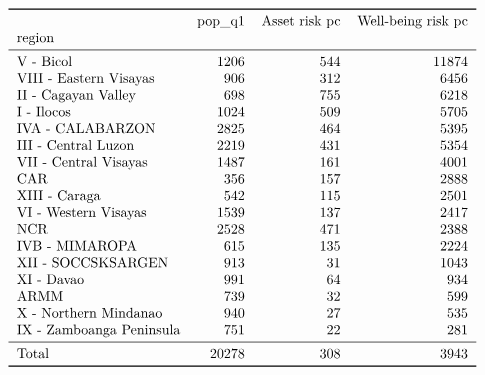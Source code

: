 \documentclass[10pt]{article}
\begin{document}
\[\begin{tabular}{lrrr}
\toprule
{} &  pop\_q1 &  Asset risk pc &  Well-being risk pc \\
region                   &         &                &                     \\
\midrule
V - Bicol                &    1206 &            544 &               11874 \\
VIII - Eastern Visayas   &     906 &            312 &                6456 \\
II - Cagayan Valley      &     698 &            755 &                6218 \\
I - Ilocos               &    1024 &            509 &                5705 \\
IVA - CALABARZON         &    2825 &            464 &                5395 \\
III - Central Luzon      &    2219 &            431 &                5354 \\
VII - Central Visayas    &    1487 &            161 &                4001 \\
CAR                      &     356 &            157 &                2888 \\
XIII - Caraga            &     542 &            115 &                2501 \\
VI - Western Visayas     &    1539 &            137 &                2417 \\
NCR                      &    2528 &            471 &                2388 \\
IVB - MIMAROPA           &     615 &            135 &                2224 \\
XII - SOCCSKSARGEN       &     913 &             31 &                1043 \\
XI - Davao               &     991 &             64 &                 934 \\
ARMM                     &     739 &             32 &                 599 \\
X - Northern Mindanao    &     940 &             27 &                 535 \\
IX - Zamboanga Peninsula &     751 &             22 &                 281 \\
\midrule
Total                    &   20278 &            308 &                3943 \\
\bottomrule
\end{tabular}
\]
\end{document}
